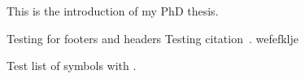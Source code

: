 This is the introduction of my PhD thesis.
\newpage

Testing for footers and headers
Testing citation~\cite{PhysRevSTAB.18.101001}.
wefefklje

Test list of symbols with \symE.